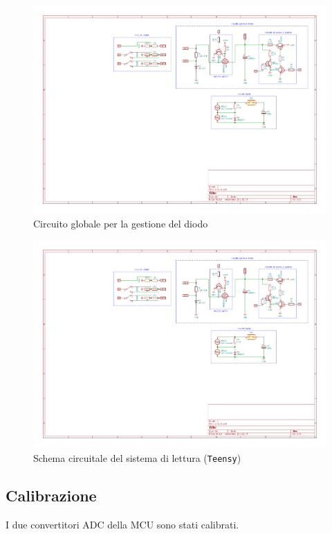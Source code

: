 \documentclass{article}[a4paper, oneside, 11pt]
\begin{document}
\begin{figure}[!htb]
	\centering 
 		\includegraphics[scale=1.3]{./gestione.pdf}
 	\caption{Circuito globale per la gestione del diodo \label{sch:gest}}
\end{figure}
\begin{figure}[!htb]
	\centering 
 		\includegraphics[scale=2.2]{./measure.pdf}
 	\caption{Schema circuitale del sistema di lettura (\texttt{Teensy})
	\label{sch:rdng}}
\end{figure}

\subsection{Calibrazione}
I due convertitori ADC della MCU sono stati calibrati.
\end{document}

